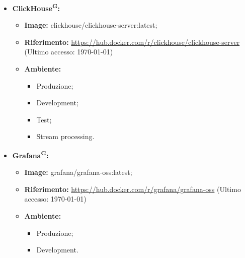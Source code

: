 \documentclass[8pt]{article}
\newcommand{\glossterm}[1]{#1\textsuperscript{G}} %
\begin{document}
\begin{itemize}
\begin{itemize}
	\setlength\itemsep{0em}
        \item \textbf{Image:} flink:1.18.1-java17; 
        \item \textbf{Riferimento:} \href{https://hub.docker.com/_/flink}{\color{myblue}https://hub.docker.com/\_/flink} (Ultimo accesso: \today)
        \item \textbf{Ambiente:}
        \begin{itemize}
	\setlength\itemsep{0em}
            \item Produzione;
            \item Development;
            \item Stream processing.
        \end{itemize}
    \end{itemize}
    \item \textbf{\glossterm{ClickHouse}:}
    \begin{itemize}
	\setlength\itemsep{0em}
        \item \textbf{Image:} clickhouse/clickhouse-server:latest;
        \item \textbf{Riferimento:} \href{https://hub.docker.com/r/clickhouse/clickhouse-server}{\color{myblue}https://hub.docker.com/r/clickhouse/clickhouse-server} (Ultimo accesso: \today)
        \item \textbf{Ambiente:}
        \begin{itemize}
	\setlength\itemsep{0em}
            \item Produzione;
            \item Development;
            \item Test;
            \item Stream processing.
        \end{itemize}
    \end{itemize}
    \item \textbf{\glossterm{Grafana}:}
    \begin{itemize}
	\setlength\itemsep{0em}
        \item \textbf{Image:} grafana/grafana-oss:latest;
        \item \textbf{Riferimento:} \href{https://hub.docker.com/r/grafana/grafana-oss}{\color{myblue}https://hub.docker.com/r/grafana/grafana-oss} (Ultimo accesso: \today)
        \item \textbf{Ambiente:}
        \begin{itemize}
	\setlength\itemsep{0em}
            \item Produzione;
            \item Development.
        \end{itemize}
    \end{itemize}
\end{itemize}
\end{document}
